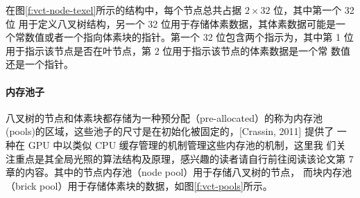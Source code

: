在图\ref{f:vct-node-texel}所示的结构中，每个节点总共占据 $2\times 32$ 位，其中第一个 32 位 用于定义八叉树结构，另一个 32 位用于存储体素数据，其体素数据可能是一 个常数值或者一个指向体素块的指针。第一个 32 位包含两个指示为，其中第 1 位用于指示该节点是否在叶节点，第 2 位用于指示该节点的体素数据是一个常 数值还是一个指针。



\paragraph{内存池子}
八叉树的节点和体素块都存储为一种预分配（pre-allocated）的称为内存池 (pools)的区域，这些池子的尺寸是在初始化被固定的，\cite{a:Gigavoxels:Avoxelbasedrenderingpipelineforefficientexplorationoflargeanddetailedscenes}[Crassin, 2011] 提供了 一种在 GPU 中以类似 CPU 缓存管理的机制管理这些内存池的机制，这里我 们关注重点是其全局光照的算法结构及原理，感兴趣的读者请自行前往阅读该论文第 7 章的内容。其中的节点内存池（node pool）用于存储八叉树的节点， 而块内存池（brick pool）用于存储体素块的数据，如图\ref{f:vct-pools}所示。

